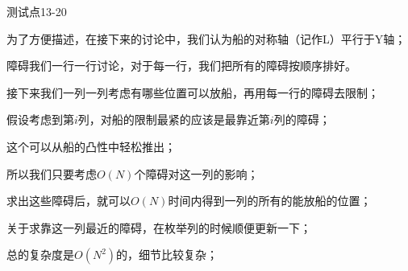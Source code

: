 \documentclass{beamer}
\begin{document}
\begin{frame}{测试点13-20}

	\par 为了方便描述，在接下来的讨论中，我们认为船的对称轴（记作L）平行于Y轴；

	\pause

	\par 障碍我们一行一行讨论，对于每一行，我们把所有的障碍按顺序排好。

	\pause

	\par 接下来我们一列一列考虑有哪些位置可以放船，再用每一行的障碍去限制；

	\pause

	\par 假设考虑到第$i$列，对船的限制最紧的应该是最靠近第$i$列的障碍；

	\par 这个可以从船的凸性中轻松推出；

	\pause

	\par 所以我们只要考虑$O(N)$个障碍对这一列的影响；

	\par 求出这些障碍后，就可以$O(N)$时间内得到一列的所有的能放船的位置；

	\pause

	\par 关于求靠这一列最近的障碍，在枚举列的时候顺便更新一下；

	\pause

	\par 总的复杂度是$O(N^2)$的，细节比较复杂；

\end{frame}
\end{document}
